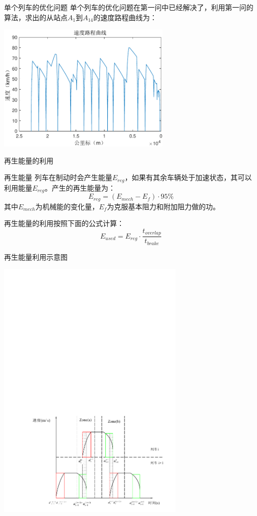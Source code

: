 \documentclass{beamer}
\begin{document}
\begin{frame}{单个列车的优化问题}
单个列车的优化问题在第一问中已经解决了，利用第一问的算法，求出的从站点$A_1$到$A_{14}$的速度路程曲线为：

\begin{center}
\includegraphics[width=8.3cm]{fig/fig11/fig11.pdf}
\end{center}
\end{frame}

\begin{frame}{再生能量的利用}

\begin{block}{再生能量}
列车在制动时会产生能量$E_{reg}$，如果有其余车辆处于加速状态，其可以利用能量$E_{reg}$。产生的再生能量为：
$$E_{reg} = (E_{mech} - E_f) \cdot 95 \%$$
其中$E_{mech}$为机械能的变化量，$E_f$为克服基本阻力和附加阻力做的功。
\end{block}

再生能量的利用按照下面的公式计算：
$$E_{used} = E_{reg} \cdot \frac{t_{overlap}}{t_{brake}}$$

\end{frame}

\begin{frame}{再生能量利用示意图}
\begin{center}
\includegraphics[trim=120 170 50 2100,clip,width=9cm]{fig/fig12/fig12.pdf}
\end{center}

\end{frame}
\end{document}
